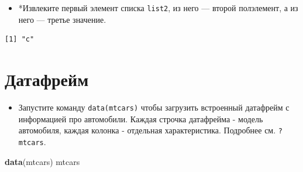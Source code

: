 \documentclass[
]{book}
\newenvironment{Shaded}{\begin{snugshade}}{\end{snugshade}}
\newcommand{\KeywordTok}[1]{\textcolor[rgb]{0.13,0.29,0.53}{\textbf{#1}}}
\newcommand{\NormalTok}[1]{#1}
\providecommand{\tightlist}{%
  \setlength{\itemsep}{0pt}\setlength{\parskip}{0pt}}
\begin{document}
\begin{itemize}
\tightlist
\item
  *Извлеките первый элемент списка \texttt{list2}, из него --- второй полэлемент, а из него --- третье значение.
\end{itemize}

\begin{verbatim}
[1] "c"
\end{verbatim}

\hypertarget{task_df}{%
\section{Датафрейм}\label{task_df}}

\begin{itemize}
\tightlist
\item
  Запустите команду \texttt{data(mtcars)} чтобы загрузить встроенный датафрейм с информацией про автомобили. Каждая строчка датафрейма - модель автомобиля, каждая колонка - отдельная характеристика. Подробнее см. \texttt{?mtcars}.
\end{itemize}

\begin{Shaded}
\begin{Highlighting}[]
\KeywordTok{data}\NormalTok{(mtcars)}
\NormalTok{mtcars}
\end{Highlighting}
\end{Shaded}
\end{document}

